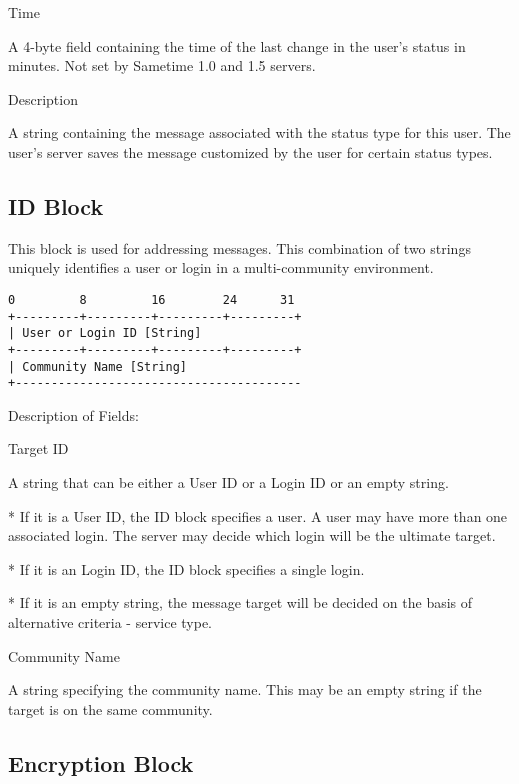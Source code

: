 \documentclass[titlepage,oneside]{book}
\begin{document}
\par{} Time

\subpar{}   A 4-byte field containing the time of the last change in the user's
  status in minutes. Not set by Sametime 1.0 and 1.5 servers.

\par{} Description

\subpar{}   A string containing the message associated with the status type for
  this user. The user's server saves the message customized by the user
  for certain status types.

\subsection{ID Block}

\par{} This block is used for addressing messages. This combination of
two strings uniquely identifies a user or login in a multi-community
environment.

\begin{verbatim}
0         8         16        24      31
+---------+---------+---------+---------+
| User or Login ID [String]
+---------+---------+---------+---------+
| Community Name [String]
+----------------------------------------
\end{verbatim}

\par{} Description of Fields:

\par{} Target ID

\subpar{}   A string that can be either a User ID or a Login ID or an empty
  string.

\subpar{}     * If it is a User ID, the ID block specifies a user. A user may
      have more than one associated login. The server may decide which
      login will be the ultimate target.

\subpar{}     * If it is an Login ID, the ID block specifies a single login.

\subpar{}     * If it is an empty string, the message target will be decided on
      the basis of alternative criteria - service type.

\par{} Community Name

\subpar{}   A string specifying the community name. This may be an empty string
  if the target is on the same community.

\subsection{Encryption Block}
\end{document}
